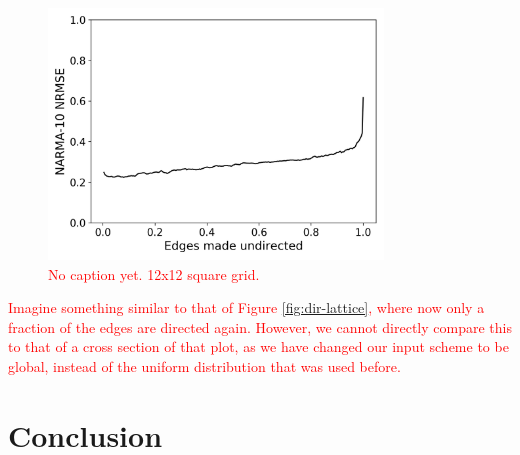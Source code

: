 \begin{figure}
  \centering
  \includegraphics[width=3.5in]{figures/undir-performance.png}
  \caption{
    \textcolor{red}{
      No caption yet. 12x12 square grid.
    }
  }
  \label{fig:undirection-performance}
\end{figure}

\textcolor{red}{
  Imagine something similar to that of Figure \ref{fig:dir-lattice}, where now
only a fraction of the edges are directed again. However, we cannot directly
compare this to that of a cross section of that plot, as we have changed our
input scheme to be global, instead of the uniform distribution that was used
before.
}

\section{Conclusion}


